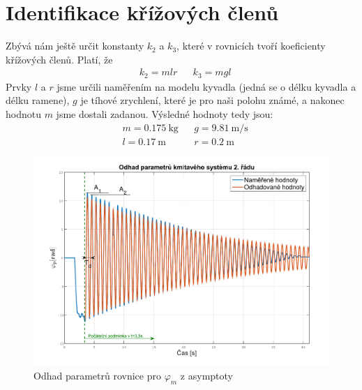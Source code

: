 \documentclass[a4paper,12pt]{article}
\begin{document}
\section{Identifikace křížových členů}
Zbývá nám ještě určit konstanty $k_2$ a $k_3$, které v rovnicích tvoří koeficienty křížových členů. Platí, že
\begin{align*}
&k_2 = mlr && k_3 = mgl
\end{align*}
Prvky $l$ a $r$ jsme určili naměřením na modelu kyvadla (jedná se o délku kyvadla a délku ramene), $g$ je tíhové zrychlení, které je pro naši polohu známé, a nakonec hodnotu $m$ jsme dostali zadanou. Výsledné hodnoty tedy jsou:
\begin{align*}
&m = \SI{0,175}{ \kilo \gram} &&g = \SI{9,81}{\meter \per \second}	\\
&l = \SI{0,17}{\meter} &&r = \SI{0,2}{\meter}
\end{align*}
\begin{figure}[H]
	\centering
    \includegraphics[scale=.6]{Odhad_phip}
    \caption{Odhad parametrů rovnice pro $\varphi_m$ z asymptoty}
\end{figure}
\end{document}
